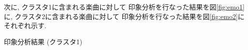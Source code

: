 \documentclass{jpreprint}
\begin{document}
\begin{multicols}{2}
次に,
クラスタ1に含まれる楽曲に対して
印象分析を行なった結果を図\ref{fig:emo1}に,
クラスタ2に含まれる楽曲に対して
印象分析を行なった結果を図\ref{fig:emo2}にそれぞれ示す.

\begin{figurehere}
  \begin{center}
  \caption{印象分析結果 (クラスタ1)}
  \label{fig:emo1}
  \end{center}
\end{figurehere}
\begin{figurehere}
  \begin{center}

\end{center}
\end{figurehere}
\end{multicols}
\end{document}
